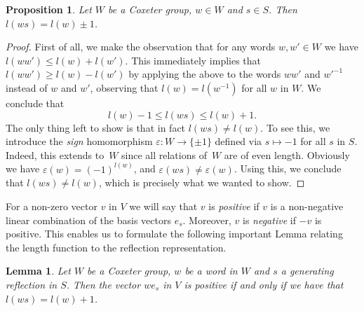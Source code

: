 \documentclass{article}
\newtheorem{lemma}[theorem]{Lemma}
\newtheorem{proposition}[theorem]{Proposition}
\theoremstyle{definition}
\begin{document}
\begin{proposition}
Let $W$ be a Coxeter group, $w \in W$ and $s \in S$. Then $l(ws) = l(w) \pm 1$.
\end{proposition}

\begin{proof}
First of all, we make the observation that for any words 
$w, w' \in W$ we have $l(ww') \leq l(w) + l(w')$. This immediately implies that $l(ww') \geq l(w) - l(w')$ by applying the above to the words $ww'$ and $w'^{-1}$ instead of $w$ and $w'$, observing that $l(w) = l(w^{-1})$ for all $w$ in $W$. We conclude that
$$l(w) - 1 \leq l(ws) \leq l(w) + 1.$$
The only thing left to show is that in fact $l(ws) \neq l(w)$. To see this, we introduce the \textit{sign} homomorphism $\varepsilon: W \rightarrow \{\pm 1\}$ defined via $s \mapsto -1$ for all $s$ in $S$. Indeed, this extends to~$W$ since all relations of~$W$ are of even length. Obviously we have $\varepsilon(w) = (-1)^{l(w)}$, and $\varepsilon(ws) \neq \varepsilon(w)$. Using this, we conclude that $l(ws) \neq l(w)$, which is precisely what we wanted to show.
\end{proof}

For a non-zero vector $v$ in $V$ we will say that $v$ is \textit{positive} if $v$ is a non-negative linear combination of the basis vectors $e_s$. Moreover, $v$ is \textit{negative} if $-v$ is positive. This enables us to formulate the following important Lemma relating the length function to the reflection representation.

\begin{lemma}\label{lem:humphreys5.4}
Let $W$ be a Coxeter group, $w$ be a word in $W$ and $s$ a generating reflection in $S$. Then the vector $we_s$ in $V$ is positive if and only if we have that $l(ws) = l(w) + 1$.
\end{lemma}
\end{document}
